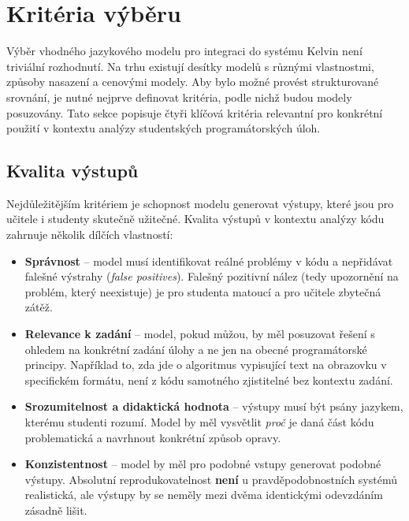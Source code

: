 \section{Kritéria výběru}
\label{sec:selection-criteria}

Výběr vhodného jazykového modelu pro integraci do systému Kelvin není triviální rozhodnutí.
Na trhu existují desítky modelů s různými vlastnostmi, způsoby nasazení a cenovými modely.
Aby bylo možné provést strukturované srovnání, je nutné nejprve definovat kritéria, podle nichž budou modely posuzovány.
Tato sekce popisuje čtyři klíčová kritéria relevantní pro konkrétní použití v kontextu analýzy studentských programátorských úloh.

\subsection{Kvalita výstupů}
\label{subsec:criteria-quality}

Nejdůležitějším kritériem je schopnost modelu generovat výstupy, které jsou pro učitele i studenty skutečně užitečné.
Kvalita výstupů v kontextu analýzy kódu zahrnuje několik dílčích vlastností:

\begin{itemize}
    \item \textbf{Správnost} -- model musí identifikovat reálné problémy v kódu a nepřidávat falešné výstrahy (\textit{false positives}).
    Falešný pozitivní nález (tedy upozornění na problém, který neexistuje) je pro studenta matoucí a pro učitele zbytečná zátěž.

    \item \textbf{Relevance k zadání} -- model, pokud můžou, by měl posuzovat řešení s ohledem na konkrétní zadání úlohy a ne jen na obecné programátorské principy.
    Například to, zda jde o algoritmus vypisující text na obrazovku v specifickém formátu, není z kódu samotného zjistitelné bez kontextu zadání.

    \item \textbf{Srozumitelnost a didaktická hodnota} -- výstupy musí být psány jazykem, kterému studenti rozumí.
    Model by měl vysvětlit \textit{proč} je daná část kódu problematická a navrhnout konkrétní způsob opravy.

    \item \textbf{Konzistentnost} -- model by měl pro podobné vstupy generovat podobné výstupy.
    Absolutní reprodukovatelnost \textbf{není} u pravděpodobnostních systémů realistická, ale výstupy by se neměly mezi dvěma identickými odevzdáním zásadně lišit.
\end{itemize}

